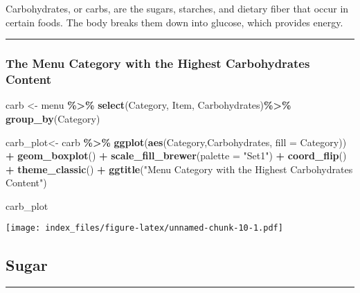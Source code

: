 \documentclass[
]{article}
\newenvironment{Shaded}{\begin{snugshade}}{\end{snugshade}}
\newcommand{\AttributeTok}[1]{\textcolor[rgb]{0.13,0.29,0.53}{#1}}
\newcommand{\FunctionTok}[1]{\textcolor[rgb]{0.13,0.29,0.53}{\textbf{#1}}}
\newcommand{\NormalTok}[1]{#1}
\newcommand{\OtherTok}[1]{\textcolor[rgb]{0.56,0.35,0.01}{#1}}
\newcommand{\SpecialCharTok}[1]{\textcolor[rgb]{0.81,0.36,0.00}{\textbf{#1}}}
\newcommand{\StringTok}[1]{\textcolor[rgb]{0.31,0.60,0.02}{#1}}
\begin{document}
Carbohydrates, or carbs, are the sugars, starches, and dietary fiber
that occur in certain foods. The body breaks them down into glucose,
which provides energy.

\begin{center}\rule{0.5\linewidth}{0.5pt}\end{center}

\hypertarget{the-menu-category-with-the-highest-carbohydrates-content}{%
\subsubsection{The Menu Category with the Highest Carbohydrates
Content}\label{the-menu-category-with-the-highest-carbohydrates-content}}

\begin{Shaded}
\begin{Highlighting}[]
\NormalTok{carb }\OtherTok{\textless{}{-}}\NormalTok{ menu }\SpecialCharTok{\%\textgreater{}\%} 
  \FunctionTok{select}\NormalTok{(Category,}
\NormalTok{         Item,}
\NormalTok{         Carbohydrates)}\SpecialCharTok{\%\textgreater{}\%} 
  \FunctionTok{group\_by}\NormalTok{(Category) }

\NormalTok{carb\_plot}\OtherTok{\textless{}{-}}\NormalTok{ carb }\SpecialCharTok{\%\textgreater{}\%}
  \FunctionTok{ggplot}\NormalTok{(}\FunctionTok{aes}\NormalTok{(Category,Carbohydrates, }
             \AttributeTok{fill =}\NormalTok{ Category)) }\SpecialCharTok{+} 
  \FunctionTok{geom\_boxplot}\NormalTok{() }\SpecialCharTok{+}
  \FunctionTok{scale\_fill\_brewer}\NormalTok{(}\AttributeTok{palette =} \StringTok{"Set1"}\NormalTok{) }\SpecialCharTok{+} \FunctionTok{coord\_flip}\NormalTok{() }\SpecialCharTok{+} \FunctionTok{theme\_classic}\NormalTok{() }\SpecialCharTok{+} \FunctionTok{ggtitle}\NormalTok{(}\StringTok{"Menu Category with the Highest Carbohydrates Content"}\NormalTok{)}

\NormalTok{carb\_plot}
\end{Highlighting}
\end{Shaded}

\texttt{[image: index\_files/figure-latex/unnamed-chunk-10-1.pdf]}

\hypertarget{sugar}{%
\subsection{Sugar}\label{sugar}}

\begin{center}\rule{0.5\linewidth}{0.5pt}\end{center}
\end{document}
